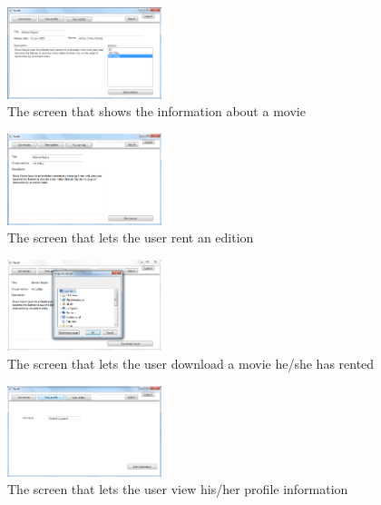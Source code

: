 \begin{figure}[h!]
  \centering
    \includegraphics[width=0.4\textwidth]{Parts/Appendix/Images/Viewmovie}
  \caption{The screen that shows the information about a movie}
  \label{fig:Appendix_GUI_PrototypeViewmovie}
\end{figure}
\begin{figure}[h!]
  \centering
    \includegraphics[width=0.4\textwidth]{Parts/Appendix/Images/RentEdition}
  \caption{The screen that lets the user rent an edition}
  \label{fig:Appendix_GUI_PrototypeRent}
\end{figure}
\begin{figure}[h!]
  \centering
    \includegraphics[width=0.4\textwidth]{Parts/Appendix/Images/Downloadmovie}
  \caption{The screen that lets the user download a movie he/she has rented}
  \label{fig:Appendix_GUI_PrototypeDownload}
\end{figure}
\begin{figure}[h!]
  \centering
    \includegraphics[width=0.4\textwidth]{Parts/Appendix/Images/Viewprofile}
  \caption{The screen that lets the user view his/her profile information}
  \label{fig:Appendix_GUI_PrototypeViewprofile}
\end{figure}
